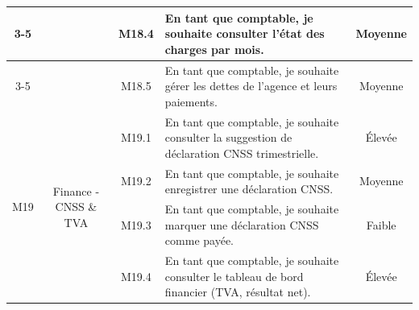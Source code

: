 \begin{longtable}{|c|c|c|p{7.2cm}|c|}
\cline{3-5}
 & & M18.4 & En tant que comptable, je souhaite consulter l'état des charges par mois. & Moyenne \\
\cline{3-5}
 & & M18.5 & En tant que comptable, je souhaite gérer les dettes de l'agence et leurs paiements. & Moyenne \\
\hline
\multirow{4}{*}{M19} & \multirow{4}{*}{Finance - CNSS \& TVA} & M19.1 & En tant que comptable, je souhaite consulter la suggestion de déclaration CNSS trimestrielle. & Élevée \\
\cline{3-5}
 & & M19.2 & En tant que comptable, je souhaite enregistrer une déclaration CNSS. & Moyenne \\
\cline{3-5}
 & & M19.3 & En tant que comptable, je souhaite marquer une déclaration CNSS comme payée. & Faible \\
\cline{3-5}
 & & M19.4 & En tant que comptable, je souhaite consulter le tableau de bord financier (TVA, résultat net). & Élevée \\
\hline
\end{longtable}
